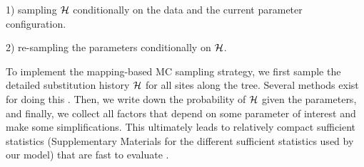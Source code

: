 1) sampling $\mathcal{H}$ conditionally on the data and the current parameter configuration.

2) re-sampling the parameters conditionally on $\mathcal{H}$.

To implement the mapping-based \acrshort{MC} sampling strategy, we first sample the detailed \gls{substitution} history $\mathcal{H}$ for all sites along the tree.
Several methods exist for doing this \citep{Nielsen2002,Rodrigue2008}.
Then, we write down the probability of $\mathcal{H}$ given the parameters, and finally, we collect all factors that depend on some parameter of interest and make some simplifications.
This ultimately leads to relatively compact sufficient statistics (Supplementary Materials for the different sufficient statistics used by our model) that are fast to evaluate \citep{Irvahn2014,Davydov2016}.


